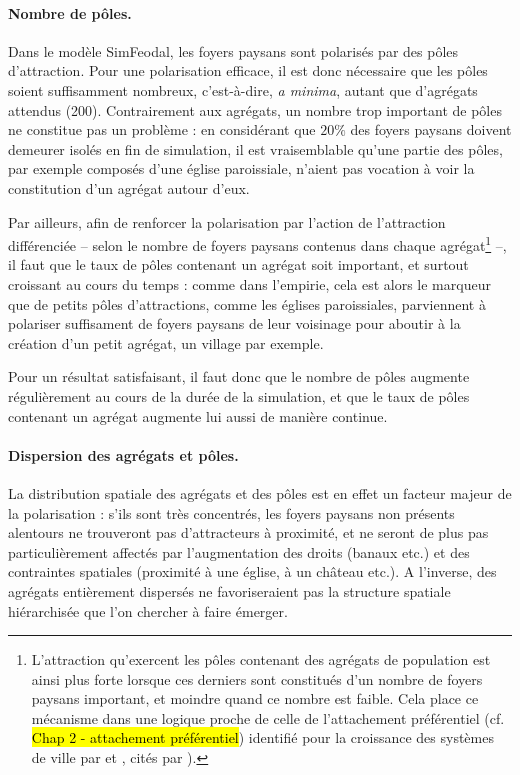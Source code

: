 \paragraph{Nombre de pôles.}\label{par:nb-poles}

Dans le modèle SimFeodal, les foyers paysans sont polarisés par des pôles d'attraction.
Pour une polarisation efficace, il est donc nécessaire que les pôles soient suffisamment nombreux, c'est-à-dire, \textit{a minima}, autant que d'agrégats attendus (200).
Contrairement aux agrégats, un nombre trop important de pôles ne constitue pas un problème :
en considérant que $20\%$ des foyers paysans doivent demeurer isolés en fin de simulation, il est vraisemblable qu'une partie des pôles, par exemple composés d'une église paroissiale, n'aient pas vocation à voir la constitution d'un agrégat autour d'eux.

Par ailleurs, afin de renforcer la polarisation par l'action de l'attraction différenciée -- selon le nombre de foyers paysans contenus dans chaque agrégat\footnote{
	L'attraction qu'exercent les pôles contenant des agrégats de population est ainsi plus forte lorsque ces derniers sont constitués d'un nombre de foyers paysans important, et moindre quand ce nombre est faible.
	Cela place ce mécanisme dans une logique proche de celle de l'attachement préférentiel (cf. \hl{Chap 2 - attachement préférentiel}) identifié pour la croissance des systèmes de ville par \cite{yule1925ii} et \cite{simon1955class}, cités par \cite[93]{schmitt_modelisation_2014}).
} --, il faut que le taux de pôles contenant un agrégat soit important, et surtout croissant au cours du temps :
comme dans l'empirie, cela est alors le marqueur que de petits pôles d'attractions, comme les églises paroissiales, parviennent à polariser suffisament de foyers paysans de leur voisinage pour aboutir à la création d'un petit agrégat, un village par exemple.

Pour un résultat satisfaisant, il faut donc que le nombre de pôles augmente régulièrement au cours de la durée de la simulation, et que le taux de pôles contenant un agrégat augmente lui aussi de manière continue.

\paragraph{Dispersion des agrégats et pôles.}\label{par:polarisation-dispersion}

La distribution spatiale des agrégats et des pôles est en effet un facteur majeur de la polarisation :
s'ils sont très concentrés, les foyers paysans non présents alentours ne trouveront pas d'attracteurs à proximité, et ne seront de plus pas particulièrement affectés par l'augmentation des droits (banaux etc.) et des contraintes spatiales (proximité à une église, à un château etc.).
A l'inverse, des agrégats entièrement dispersés ne favoriseraient pas la structure spatiale hiérarchisée que l'on chercher à faire émerger.

